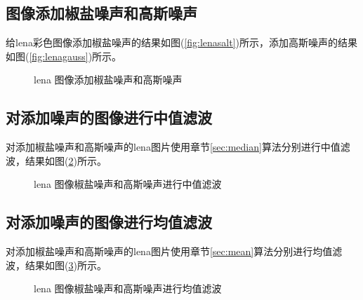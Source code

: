 \documentclass{hitreport}
\begin{document}
\subsection{图像添加椒盐噪声和高斯噪声}

给lena彩色图像添加椒盐噪声的结果如图(\ref{fig:lenasalt})所示，添加高斯噪声的结果如图(\ref{fig:lenagauss})所示。

\begin{figure}[htb]
	\centering
	\hspace{20pt}
	\caption{lena 图像添加椒盐噪声和高斯噪声}\label{fig:lenanoise}
\end{figure}

\subsection{对添加噪声的图像进行中值滤波}

对添加椒盐噪声和高斯噪声的lena图片使用章节\ref{sec:median}算法分别进行中值滤波，结果如图(\ref{fig:lenamedian})所示。

\begin{figure}[htb]
	\centering
	\hspace{20pt}
	\caption{lena 图像椒盐噪声和高斯噪声进行中值滤波}\label{fig:lenamedian}
\end{figure}

\subsection{对添加噪声的图像进行均值滤波}

对添加椒盐噪声和高斯噪声的lena图片使用章节\ref{sec:mean}算法分别进行均值滤波，结果如图(\ref{fig:lenamean})所示。

\begin{figure}[htb]
	\centering
	\hspace{20pt}
	\caption{lena 图像椒盐噪声和高斯噪声进行均值滤波}\label{fig:lenamean}
\end{figure}
\end{document}
